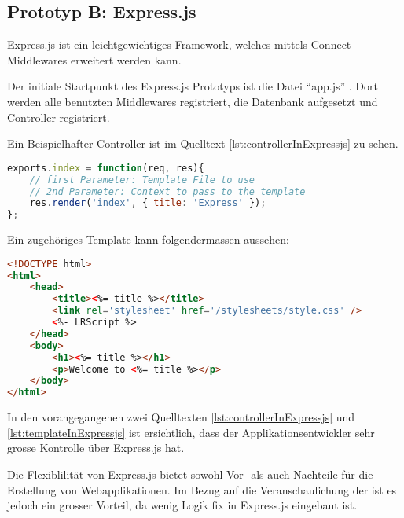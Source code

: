 \subsection{Prototyp B: Express.js}

Express.js \cite{Expressjs} ist ein leichtgewichtiges Framework, welches mittels Connect-Middlewares \cite{connect} erweitert werden kann.

Der initiale Startpunkt des Express.js Prototyps ist die Datei ``app.js'' \cite{ExpressjsPrototypAppjs}. Dort werden alle benutzten Middlewares registriert, die Datenbank aufgesetzt und Controller registriert.

Ein Beispielhafter Controller ist im Quelltext \ref{lst:controllerInExpressjs} zu sehen.

\begin{lstlisting}[language=JavaScript, caption=Beispiel eines Controllers in Express.js, label=lst:controllerInExpressjs]
exports.index = function(req, res){
	// first Parameter: Template File to use
	// 2nd Parameter: Context to pass to the template
	res.render('index', { title: 'Express' });
};
\end{lstlisting}

Ein zugehöriges Template kann folgendermassen aussehen:

\begin{lstlisting}[language=HTML, caption=Template in Express.js, label=lst:templateInExpressjs]
<!DOCTYPE html>
<html>
	<head>
		<title><%= title %></title>
		<link rel='stylesheet' href='/stylesheets/style.css' />
		<%- LRScript %>
	</head>
	<body>
		<h1><%= title %></h1>
		<p>Welcome to <%= title %></p>
	</body>
</html>
\end{lstlisting}

In den vorangegangenen zwei Quelltexten \ref{lst:controllerInExpressjs} und \ref{lst:templateInExpressjs} ist ersichtlich, dass der Applikationsentwickler sehr grosse Kontrolle über Express.js hat.

Die Flexiblilität von Express.js bietet sowohl Vor- als auch Nachteile für die Erstellung von Webapplikationen. Im Bezug auf die Veranschaulichung der  ist es jedoch ein grosser Vorteil, da wenig Logik fix in Express.js eingebaut ist.